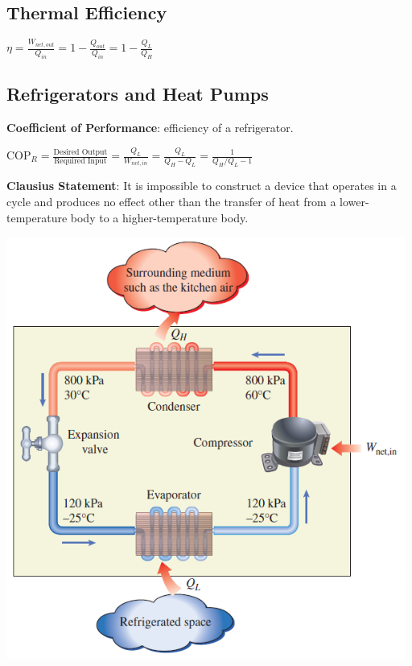 \documentclass{article}
\begin{document}
\begin{multicols}{3}
    \subsection*{Thermal Efficiency}
    $\eta = \frac{W_{net,out}}{Q_{in}}=1-\frac{Q_{out}}{Q_{in}}=1-\frac{Q_L}{Q_H}$
    \subsection*{Refrigerators and Heat Pumps}
    \textbf{Coefficient of Performance}: efficiency of a refrigerator.\par 
    $\text{COP}_R=\frac{\text{Desired Output}}{\text{Required Input}}=\frac{Q_L}{W_{net,in}}=\frac{Q_L}{Q_H-Q_L}=\frac{1}{Q_H/Q_L-1}$ \par 
    \textbf{Clausius Statement}: It is impossible to construct a device that operates in a cycle and produces no effect other than the transfer of heat from a lower-temperature body to a higher-temperature body.\par
    \includegraphics[width=0.75\linewidth]{Images/refrigerator.png}

\end{multicols}
\end{document}
